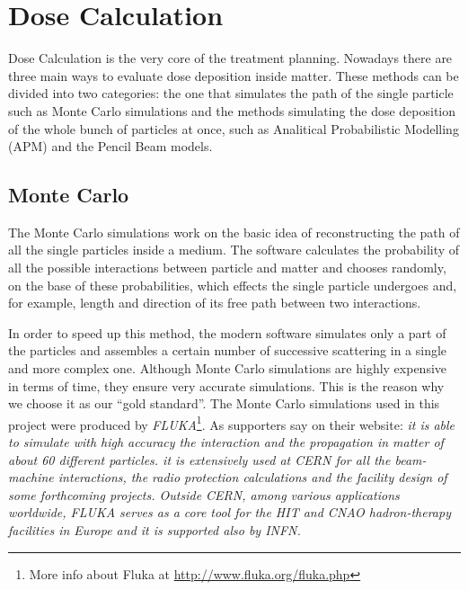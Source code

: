 \documentclass[12pt, a4paper, twoside]{book}
\begin{document}
\section{Dose Calculation}
Dose Calculation is the very core of the treatment planning. 
Nowadays there are three main ways to evaluate dose deposition inside matter. These methods can be divided into two categories: the one that simulates the path of the single particle such as Monte Carlo simulations and the methods simulating the dose deposition of the whole bunch of particles at once, such as Analitical Probabilistic Modelling (APM) and the Pencil Beam models.




\subsection{Monte Carlo}
The Monte Carlo simulations work on the basic idea of reconstructing the path of all the single particles inside a medium. The software calculates the probability of all the possible interactions between particle and matter and chooses randomly, on the base of these probabilities, which effects the single particle undergoes and, for example, length and direction of its free path between two interactions.

In order to speed up this method, the modern software simulates only a part of the particles and assembles a certain number of successive scattering in a single and more complex one. Although Monte Carlo simulations are highly expensive in terms of time, they ensure very accurate simulations. This is the reason why we choose it as our ``gold standard''.
The Monte Carlo simulations used in this project were produced by \emph{FLUKA}\footnote{More info about Fluka at \url{http://www.fluka.org/fluka.php}}. As supporters say on their website: \emph{it is able to simulate with high accuracy the interaction and the propagation in matter of about 60 different particles. it is extensively used at CERN for all the beam-machine interactions, the radio protection calculations and the facility design of some forthcoming projects. 
Outside CERN, among various applications worldwide, FLUKA serves as a core tool for the HIT and CNAO hadron-therapy facilities in Europe and it is supported also by \emph{INFN}.}
\end{document}
